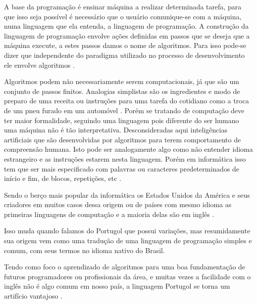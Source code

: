 \ifdraft{\color{green}}{}A base da programação é ensinar máquina a realizar determinada tarefa, para que isso seja possível é necessário que o usuário comunique-se com a máquina, numa linguagem que ela entenda, a linguagem de programação. A construção da linguagem de programação envolve ações definidas em passos que se deseja que a máquina execute, a estes passos damos o nome de algoritmos. Para isso pode-se dizer que independente do paradigma utilizado no processo de desenvolvimento ele envolve algoritmos \cite{medeiros2015}.

Algoritmos podem não necessariamente serem computacionais, já que são um conjunto de passos finitos. Analogias simplistas são os ingredientes e modo de preparo de uma receita ou instruções para uma tarefa do cotidiano como a troca de um pneu furado em um automóvel \cite{medina2006etal}. Porém se tratando de computação deve ter maior formalidade, seguindo uma linguagem pois diferente do ser humano uma máquina não é tão interpretativa. Desconsideradas aqui inteligências artificiais que são desenvolvidas por algoritmos para terem  comportamento de compreensão humana. Isto pode ser analogamente algo como não entender idioma estrangeiro e as instruções estarem nesta linguagem. Porém em informática isso tem que ser mais especificado com palavras ou caracteres predeterminados de início e fim, de blocos, repetições, etc \cite{dershem1990etal}.

Sendo o berço mais popular da informática os Estados Unidos da América e seus criadores em muitos casos dessa origem ou de países com mesmo idioma as primeiras linguagens de computação e a maioria delas são em inglês \cite{sebesta2009}.

Isso muda quando falamos do Portugol que possui variações, mas resumidamente sua origem vem como uma tradução de uma linguagem de programação simples e comum, com seus termos no idioma nativo do Brasil.

Tendo como foco o aprendizado de algoritmos para uma boa fundamentação de futuros programadores ou profissionais da área, e muitas vezes a facilidade com o inglês não é algo comum em nosso país, a linguagem Portugol se torna um artifício vantajoso \cite{jesus2004etal}.\color{black}
